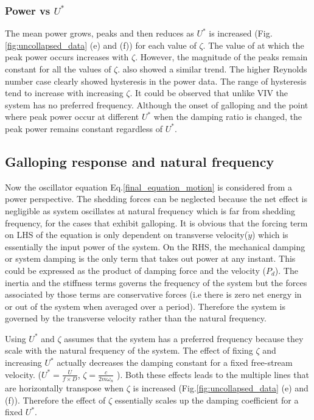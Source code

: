  
 \subsubsection*{Power vs $U^*$}
 
 The mean power grows, peaks and then reduces as $U^*$ is increased (Fig.\ref{fig:uncollapsed_data} (e) and (f)) for each value of $\zeta$. The value of \ustar at which the peak power occurs increases with $\zeta$. However, the magnitude of the peaks remain constant for all the values of $\zeta$.  \cite{Barrero-Gil2010a} also showed a similar trend. The higher Reynolds number case clearly showed hysteresis in the power data. The range of hysteresis tend to increase with increasing $\zeta$. It could be observed that unlike VIV the  system has no preferred frequency. Although the onset of galloping and the point where peak power occur at different $U^*$ when the damping ratio is changed, the peak power remains constant regardless of $U^*$.
 
 \subsection{Galloping response and natural frequency}
 
 Now the oscillator equation Eq.\eqref{final_equation_motion} is considered from a power perspective. The shedding forces can be neglected because the net effect is negligible as system oscillates at natural frequency which is far from shedding frequency, for the cases that exhibit galloping. It is obvious that the forcing term on LHS of the equation is only dependent on transverse velocity($\dot{y}$) which is essentially the input power of the system. On the RHS, the mechanical damping or system damping is the only term that takes out power at any instant. This could be expressed as the product of damping force and the velocity ($P_d$). The inertia and the stiffness terms governs the frequency of the system but the forces associated by those terms are conservative forces (i.e there is zero net energy in or out of the system when averaged over a period). Therefore the system is governed by the transverse velocity rather than the natural frequency.
 

 Using $U^*$ and $\zeta$ assumes that the system has a preferred frequency because they scale with the natural frequency of the system. The effect of fixing $\zeta$ and increasing $U^*$ actually decreases the damping constant for a fixed free-stream velocity. ($U^*=\frac{U}{f \times D}$, $\zeta= \frac{c}{2 m \omega_n}$ ). Both these effects leads to the multiple lines that are horizontally transpose when $\zeta$ is increased (Fig.\ref{fig:uncollapsed_data} (e) and (f)). Therefore the effect of $\zeta$ essentially scales up the damping coefficient for a fixed $U^*$.
 
